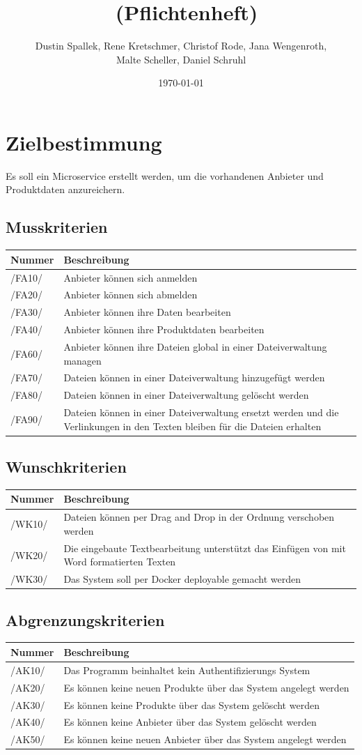 \documentclass[a4paper,12pt]{article}
\title{\projektName~(Pflichtenheft)}
\author{Dustin Spallek, Rene Kretschmer, Christof Rode, Jana Wengenroth, \\Malte Scheller, Daniel Schruhl}
\date{\today}
\newcommand\addrow[2]{#1 &#2\\ }
\newcommand\addheading[2]{#1 &#2\\ \hline}
\newcommand\tabularhead{\begin{tabular}{lp{13cm}}
\hline
}
\newenvironment{usecase}{\tabularhead}
{\hline\end{tabular}}
\begin{document}
 \setcounter{page}{2}
 \tableofcontents          %
 \clearpage
 
\section{Zielbestimmung}

Es soll ein Microservice erstellt werden, um die vorhandenen Anbieter und Produktdaten anzureichern.

\subsection{Musskriterien}
\begin{usecase}
  \addheading{Nummer}{Beschreibung} 
  \addrow{/FA10/}{Anbieter können sich anmelden}
  \addrow{/FA20/}{Anbieter können sich abmelden}
  \addrow{/FA30/}{Anbieter können ihre Daten bearbeiten}
  \addrow{/FA40/}{Anbieter können ihre Produktdaten bearbeiten}
  \addrow{/FA60/}{Anbieter können ihre Dateien global in einer Dateiverwaltung managen}
  \addrow{/FA70/}{Dateien können in einer Dateiverwaltung hinzugefügt werden}
  \addrow{/FA80/}{Dateien können in einer Dateiverwaltung gelöscht werden}
  \addrow{/FA90/}{Dateien können in einer Dateiverwaltung ersetzt werden und die Verlinkungen in den Texten bleiben für die Dateien erhalten}
\end{usecase}

\subsection{Wunschkriterien}
\begin{usecase}
  \addheading{Nummer}{Beschreibung} 
  \addrow{/WK10/}{Dateien können per Drag and Drop in der Ordnung verschoben werden}
  \addrow{/WK20/}{Die eingebaute Textbearbeitung unterstützt das Einfügen von mit Word formatierten Texten}
  \addrow{/WK30/}{Das System soll per Docker deployable gemacht werden}
\end{usecase}

\subsection{Abgrenzungskriterien}
\begin{usecase}
  \addheading{Nummer}{Beschreibung} 
  \addrow{/AK10/}{Das Programm beinhaltet kein Authentifizierungs System}
  \addrow{/AK20/}{Es können keine neuen Produkte über das System angelegt werden}
  \addrow{/AK30/}{Es können keine Produkte über das System gelöscht werden}
  \addrow{/AK40/}{Es können keine Anbieter über das System gelöscht werden}
  \addrow{/AK50/}{Es können keine neuen Anbieter über das System angelegt werden}
\end{usecase}
\end{document}
